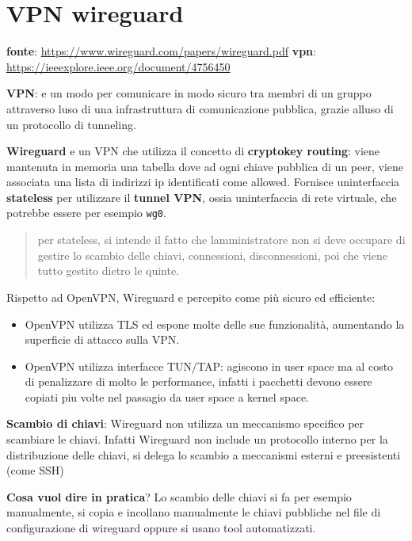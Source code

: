 \section{VPN wireguard}\label{vpn-wireguard}

\textbf{fonte}: \url{https://www.wireguard.com/papers/wireguard.pdf}
\textbf{vpn}: \url{https://ieeexplore.ieee.org/document/4756450}

\textbf{VPN}: e\textquotesingle{} un modo per comunicare in modo sicuro
tra membri di un gruppo attraverso l\textquotesingle uso di una
infrastruttura di comunicazione pubblica, grazie all\textquotesingle uso
di un protocollo di tunneling.

\textbf{Wireguard} e\textquotesingle{} un VPN che utilizza il concetto
di \textbf{cryptokey routing}: viene mantenuta in memoria una tabella
dove ad ogni chiave pubblica di un peer, viene associata una lista di
indirizzi ip identificati come allowed. Fornisce
un\textquotesingle interfaccia \textbf{stateless} per utilizzare il
\textbf{tunnel VPN}, ossia un\textquotesingle interfaccia di rete
virtuale, che potrebbe essere per esempio \passthrough{\lstinline!wg0!}.

\begin{quote}
per stateless, si intende il fatto che l\textquotesingle amministratore
non si deve occupare di gestire lo scambio delle chiavi, connessioni,
disconnessioni, poi che viene tutto gestito dietro le quinte.
\end{quote}

Rispetto ad OpenVPN, Wireguard e\textquotesingle{} percepito come più
sicuro ed efficiente:

\begin{itemize}
\tightlist
\item
  OpenVPN utilizza TLS ed espone molte delle sue funzionalità,
  aumentando la superficie di attacco sulla VPN.
\item
  OpenVPN utilizza interfacce TUN/TAP: agiscono in user space ma al
  costo di penalizzare di molto le performance, infatti i pacchetti
  devono essere copiati piu volte nel passagio da user space a kernel
  space.
\end{itemize}

\textbf{Scambio di chiavi}: Wireguard non utilizza un meccanismo
specifico per scambiare le chiavi. Infatti Wireguard non include un
protocollo interno per la distribuzione delle chiavi, si delega lo
scambio a meccanismi esterni e preesistenti (come SSH)

\textbf{Cosa vuol dire in pratica}? Lo scambio delle chiavi si fa per
esempio manualmente, si copia e incollano manualmente le chiavi
pubbliche nel file di configurazione di wireguard oppure si usano tool
automatizzati.

